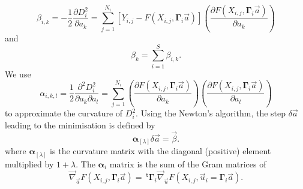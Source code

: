 \documentclass[aps,twocolumn]{revtex4}
\newcommand{\mymat}[1]{\boldsymbol{#1}}
\newcommand{\mytrn}[1]{~^{\mathsf{t}}#1}
\begin{document}
\begin{equation}
	\beta_{i,k} = -\dfrac{1}{2}\dfrac{\partial D_i^2}{\partial a_k} 
	= \sum_{j=1}^{N_i} \left[
	Y_{i,j} - F\left(X_{i,j},\mymat{\Gamma}_i \vec{a}\right)
	\right] 
	\left(\dfrac{\partial F(X_{i,j},\mymat{\Gamma}_i \vec{a})}{\partial a_k}\right)
\end{equation}
and
\begin{equation}
	\beta_k = \sum_{i=1}^{S} \beta_{i,k}.
\end{equation}
We use
\begin{equation}
	\alpha_{i,k,l} = \dfrac{1}{2} \dfrac{\partial^2 D_i^2}{\partial a_k\partial a_l} =
	\sum_{j=1}^{N_i} 
	 \left(\dfrac{\partial F(X_{i,j},\mymat{\Gamma}_i \vec{a})}{\partial a_k}\right) \left(\dfrac{\partial F(X_{i,j},\mymat{\Gamma}_i \vec{a})}{\partial a_l}\right) 
\end{equation}
to approximate the curvature of $D_i^2$.
Using the Newton's algorithm, the step $\delta\vec{a}$ leading to the minimisation is defined by
\begin{equation}
	\mymat{\alpha}_{[\lambda]} \delta\vec{a} = \vec{\beta}.
\end{equation}
where $\mymat{\alpha}_{[\lambda]}$ is the curvature matrix with the diagonal (positive) element multiplied by $1+\lambda$.
The $\mymat{\alpha}_i$ matrix is the sum of the Gram matrices
of
\begin{equation}
	\vec{\nabla}_{\vec{a}} F(X_{i,j},\mymat{\Gamma}_i \vec{a})
	= \mytrn{\mymat{\Gamma}}_i 
	 \vec{\nabla}_{\vec{u}} F(X_{i,j},\vec{u}_i = \mymat{\Gamma}_i \vec{a}).
\end{equation}
\end{document}
